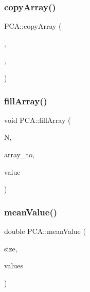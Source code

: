 \hypertarget{namespace_p_c_a_a2e31962f6d08fdd98626faf1e2e25094}{}\label{namespace_p_c_a_a2e31962f6d08fdd98626faf1e2e25094} 
\subsubsection{\texorpdfstring{copy\+Array()}{copyArray()}\hspace{0.1cm}{\footnotesize\ttfamily [8/8]}}
{\footnotesize\ttfamily P\+C\+A\+::copy\+Array (\begin{DoxyParamCaption}\item[{num\+Sites}]{,  }\item[{\hyperlink{namespace_p_c_a_a4a22821642ff929e86e49ad05b7545ad}{u}}]{,  }\item[{u\+\_\+in}]{ }\end{DoxyParamCaption})}

\hypertarget{namespace_p_c_a_af4a7844595578d2c8e09635fba6db3b2}{}\label{namespace_p_c_a_af4a7844595578d2c8e09635fba6db3b2} 
\subsubsection{\texorpdfstring{fill\+Array()}{fillArray()}}
{\footnotesize\ttfamily void P\+C\+A\+::fill\+Array (\begin{DoxyParamCaption}\item[{int}]{N,  }\item[{double $\ast$}]{array\+\_\+to,  }\item[{double}]{value }\end{DoxyParamCaption})}

\hypertarget{namespace_p_c_a_a330e0aee67470237e1e755eb5b151d6c}{}\label{namespace_p_c_a_a330e0aee67470237e1e755eb5b151d6c} 
\subsubsection{\texorpdfstring{mean\+Value()}{meanValue()}}
{\footnotesize\ttfamily double P\+C\+A\+::mean\+Value (\begin{DoxyParamCaption}\item[{int}]{size,  }\item[{const double $\ast$}]{values }\end{DoxyParamCaption})}

